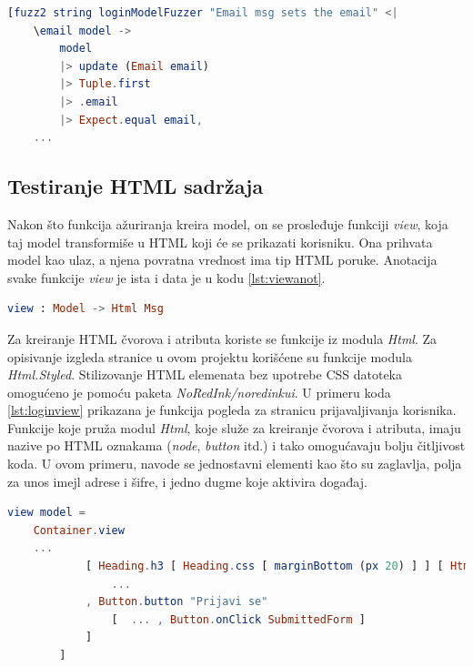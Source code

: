 \documentclass[12pt,oneside]{memoir}
\begin{document}
\begin{lstlisting}[language=elm, caption={Testovi za funkciju \emph{update} modula \emph{LoginPage}},captionpos=b, label={lst:loginupdatetest}]
    [fuzz2 string loginModelFuzzer "Email msg sets the email" <|
    \email model -> 
        model
        |> update (Email email)
        |> Tuple.first 
        |> .email 
        |> Expect.equal email,
    ...
\end{lstlisting}


\subsection{Testiranje HTML sadržaja}

\par Nakon što funkcija ažuriranja kreira model, on se prosleđuje funkciji \emph{view}, koja taj model transformiše u HTML koji će se prikazati korisniku. Ona prihvata model kao ulaz, a njena povratna vrednost ima tip HTML poruke. Anotacija svake funkcije \emph{view} je ista i data je u kodu \ref{lst:viewanot}.

\begin{lstlisting}[language=elm, caption={Anotacija funkcije \emph{view}},captionpos=b, label={lst:viewanot}]
view : Model -> Html Msg
\end{lstlisting}

\par Za kreiranje HTML čvorova i atributa koriste se funkcije iz modula \emph{Html}. Za opisivanje izgleda stranice u ovom projektu korišćene su funkcije modula \emph{Html.Styled}. Stilizovanje HTML elemenata bez upotrebe CSS datoteka omogućeno je pomoću paketa \emph{NoRedInk/noredinkui}. U primeru koda \ref{lst:loginview} prikazana je funkcija pogleda za stranicu prijavaljivanja korisnika. Funkcije koje pruža modul \emph{Html}, koje služe za kreiranje čvorova i atributa, imaju nazive po HTML oznakama (\emph{node}, \emph{button} itd.) i tako omogućavaju bolju čitljivost koda. U ovom primeru, navode se jednostavni elementi kao što su zaglavlja, polja za unos imejl adrese i šifre, i jedno dugme koje aktivira događaj. 

\begin{lstlisting}[language=elm, caption={Funkcija \emph{view} modula \emph{LoginPage}},captionpos=b, label={lst:loginview}]
view model =
    Container.view
  	...
            [ Heading.h3 [ Heading.css [ marginBottom (px 20) ] ] [ Html.text "Prijava korisnika" ]
            	... 
            , Button.button "Prijavi se"
                [  ... , Button.onClick SubmittedForm ]
            ]
        ]
\end{lstlisting}
\end{document}

